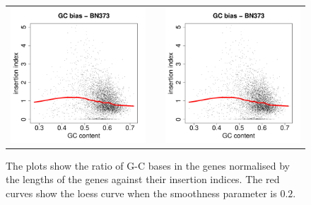 \documentclass[12pt,letterpaper]{article}
\begin{document}
\begin{figure}
\begin{tabular}{c c c}
\includegraphics[page=37, scale=0.25]{biases.pdf}&&
\includegraphics[page=40, scale=0.25]{biases.pdf}\\
\end{tabular}
\caption{The plots show the ratio of G-C bases in the genes normalised by the lengths of the genes against their insertion indices. The red curves show the loess curve when the smoothness parameter is $0.2$.}
\label{fig:GC-bias}
\end{figure}
\end{document}
